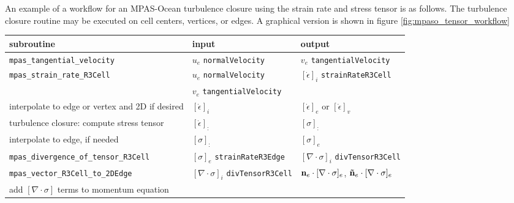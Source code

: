 \documentclass[11pt]{report}
\begin{document}
An example of a workflow for an MPAS-Ocean turbulence closure using the strain rate and stress tensor is as follows.  The turbulence closure routine may be executed on cell centers, vertices, or edges.  A graphical version is shown in figure \ref{fig:mpaso_tensor_workflow}
\\
\begin{tabular}{ |l| l| l| }
\hline
  {\bf subroutine} &  {\bf input} &  {\bf output} \\
\hline
\verb|mpas_tangential_velocity|  & $u_e$ \verb|normalVelocity| & $v_e$ \verb|tangentialVelocity|  \\
\verb|mpas_strain_rate_R3Cell|   & $u_e$ \verb|normalVelocity| & $\left[\dot\epsilon  \right]_i$ \verb|strainRateR3Cell|\\
&  $v_e$ \verb|tangentialVelocity| &\\
interpolate to edge or vertex and 2D if desired &  $\left[\dot\epsilon  \right]_i$ &  $\left[\dot\epsilon  \right]_e$ or $\left[\dot\epsilon  \right]_v$\\
turbulence closure: compute stress tensor &  $\left[\dot\epsilon  \right]_:$ &  $\left[\sigma  \right]_:$\\
interpolate to edge, if needed   & $\left[\sigma  \right]_:$&  $\left[\sigma  \right]_e$\\
\verb|mpas_divergence_of_tensor_R3Cell|   &  $\left[\sigma  \right]_e$ \verb|strainRateR3Edge|& $[\nabla \cdot \sigma]_{i}$ \verb|divTensorR3Cell|\\
\verb|mpas_vector_R3Cell_to_2DEdge|  &  $[\nabla \cdot \sigma]_{i}$ \verb|divTensorR3Cell| & ${\bf n}_e\cdot[\nabla \cdot \sigma]_{e}$, ${\bf \tilde n}_e\cdot[\nabla \cdot \sigma]_{e}$ \\
add $[\nabla \cdot \sigma]$ terms to momentum equation & & \\
\hline
\end{tabular}
\end{document}
